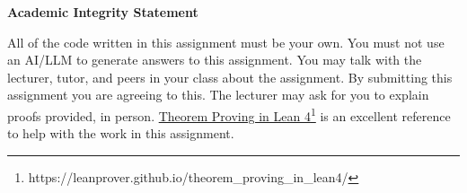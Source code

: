 \documentclass[12pt,letterpaper, onecolumn]{exam}
\begin{document}
\vspace{2mm}
\textbf{Academic Integrity Statement}

All of the code written in this assignment must be your own. You must not use an AI/LLM to generate answers to this assignment. You may talk with the lecturer, tutor, and peers in your class about the assignment. By submitting this assignment you are agreeing to this. The lecturer may ask for you to explain proofs provided, in person. \href{https://leanprover.github.io/theorem_proving_in_lean4/}{Theorem Proving in Lean 4}\footnote{https://leanprover.github.io/theorem\_proving\_in\_lean4/} is an excellent reference to help with the work in this assignment.
\end{document}
